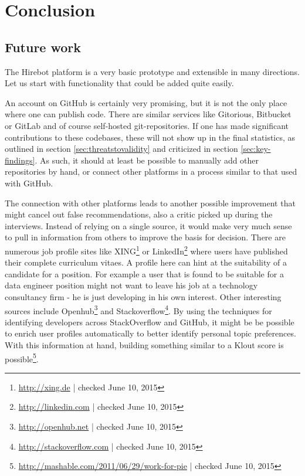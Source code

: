 \chapter{Conclusion}\label{ch:conclusion}
\section{Future work}\label{sec:future-work}
The Hirebot platform is a very basic prototype and extensible in many directions. Let us start with functionality that could be added quite easily.

An account on GitHub is certainly very promising, but it is not the only place where one can publish code. There are similar services like Gitorious, Bitbucket or GitLab and of course self-hosted git-repositories. If one has made significant contributions to these codebases, these will not show up in the final statistics, as outlined in section \ref{sec:threatstovalidity} and criticized in section \ref{sec:key-findings}. As such, it should at least be possible to manually add other repositories by hand, or connect other platforms in a process similar to that used with GitHub.

The connection with other platforms leads to another possible improvement that might cancel out false recommendations, also a critic picked up during the interviews. Instead of relying on a single source, it would make very much sense to pull in information from others to improve the basis for decision. There are numerous job profile sites like XING\footnote{\url{http://xing.de} | checked June 10, 2015} or LinkedIn\footnote{\url{http://linkedin.com} | checked June 10, 2015} where users have published their complete curriculum vitaes. A profile here can hint at the suitability of a candidate for a position. For example a user that is found to be suitable for a data engineer position might not want to leave his job at a technology consultancy firm - he is just developing in his own interest. Other interesting sources include Openhub\footnote{\url{http://openhub.net} | checked June 10, 2015} and Stackoverflow\footnote{\url{http://stackoverflow.com} | checked June 10, 2015}. By using the techniques for identifying developers across StackOverflow and GitHub\cite{vfs:2012}, it might be be possible to enrich user profiles automatically to better identify personal topic preferences. With this information at hand, building something similar to a Klout score is possible\footnote{\url{http://mashable.com/2011/06/29/work-for-pie} | checked June 10, 2015}.

